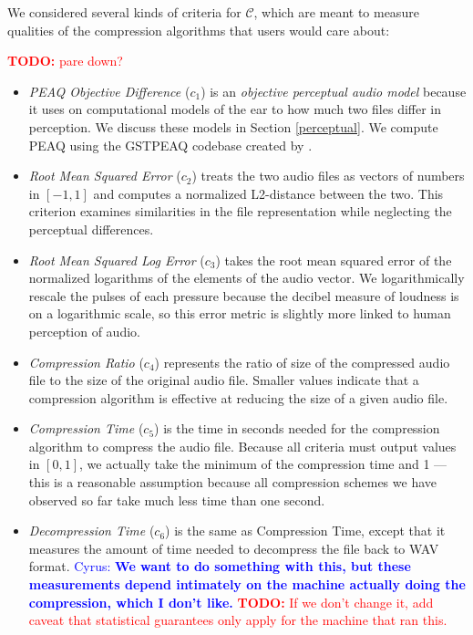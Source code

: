\documentclass{article}
\newcommand\todo[1]{\textcolor{red}{\textbf{TODO:} #1}}
\newcommand{\cc}[1]{\textcolor{blue}{Cyrus: \textbf{#1}}}
\begin{document}
{We considered several kinds of criteria for $\mathcal{C}$, which are meant to measure qualities of the compression algorithms that users would care about:

\todo{pare down?}
\begin{itemize}[wide, labelwidth=!, labelindent=0pt]
\setlength{\itemsep}{0pt}
\setlength{\parskip}{0pt}
    \item \textit{PEAQ Objective Difference} ($c_1$) is an \textit{objective perceptual audio model} because it uses on computational models of the ear to how much two files differ in perception. We discuss these models in Section \ref{perceptual}. We compute PEAQ using the GSTPEAQ codebase created by \cite{holters}. 
    \item \textit{Root Mean Squared Error} ($c_2$) treats the two audio files as vectors of numbers in $[-1,1]$ and computes a normalized L2-distance between the two. This criterion examines similarities in the file representation while neglecting the perceptual differences.
    \item \textit{Root Mean Squared Log Error} ($c_3$) takes the root mean squared error of the normalized logarithms of the elements of the audio vector. We logarithmically rescale the pulses of each pressure because the decibel measure of loudness is on a logarithmic scale, so this error metric is slightly more linked to human perception of audio.  %
    \item \textit{Compression Ratio} ($c_4$) represents the ratio of size of the compressed audio file to the size of the original audio file. Smaller values indicate that a compression algorithm is effective at reducing the size of a given audio file.
    \item \textit{Compression Time} ($c_5$) is the time in seconds needed for the compression algorithm to compress the audio file. Because all criteria must output values in $[0,1]$, we actually take the minimum of the compression time and 1 --- this is a reasonable assumption because all compression schemes we have observed so far take much less time than one second.
    \item \textit{Decompression Time} ($c_6$) is the same as Compression Time, except that it measures the amount of time needed to decompress the file back to WAV format.  \cc{We want to do something with this, but these measurements depend intimately on the machine actually doing the compression, which I don't like.} \todo{If we don't change it, add caveat that statistical guarantees only apply for the machine that ran this.}
\end{itemize}

}
\end{document}
